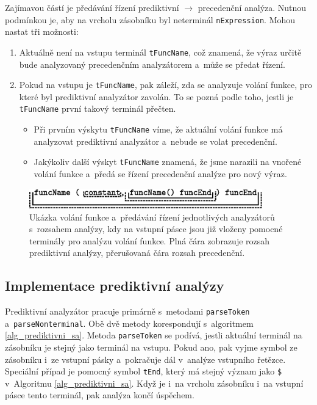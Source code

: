 Zajímavou částí je předávání řízení prediktivní $\rightarrow$ precedenční analýza.
Nutnou podmínkou je, aby na vrcholu zásobníku byl neterminál \texttt{nExpression}.
Mohou nastat tři možnosti:
\begin{enumerate}[label=\arabic*)]
    \item Aktuálně není na vstupu terminál \texttt{tFuncName}, což znamená, že výraz určitě bude analyzovaný precedenčním analyzátorem a~může se předat řízení.
    \item Pokud na vstupu je \texttt{tFuncName}, pak záleží, zda se analyzuje volání funkce, pro které byl prediktivní analyzátor zavolán.
    To se pozná podle toho, jestli je \texttt{tFuncName} první takový terminál přečten. 
    \begin{itemize}
        \item Při prvním výskytu \texttt{tFuncName} víme, že aktuální volání funkce má analyzovat prediktivní analyzátor a~nebude se volat precedenční.
        \item Jakýkoliv další výskyt \texttt{tFuncName} znamená, že jsme narazili na vnořené volání funkce a~předá se řízení precedenční analýze pro nový výraz.
    \end{itemize}  
\end{enumerate}

\begin{figure}[ht]
    \centering
    \includegraphics[width=0.9\textwidth]{obrazky-figures/volani_funkce.eps}
    \caption{Ukázka volání funkce a~předávání řízení jednotlivých analyzátorů s~rozsahem analýzy, kdy na vstupní pásce jsou již vloženy pomocné terminály pro analýzu volání funkce.
    Plná čára zobrazuje rozsah prediktivní analýzy, přerušovaná čára rozsah precedenční. }
    \label{hovno}
\end{figure}

\subsection*{Implementace prediktivní analýzy}
Prediktivní analyzátor pracuje primárně s~metodami \texttt{parseToken} a~\texttt{parseNonterminal}.
Obě dvě metody korespondují s~algoritmem \ref{alg_prediktivni_sa}.
Metoda \texttt{parseToken} se podívá, jestli aktuální terminál na zásobníku je stejný jako terminál na vstupu.
Pokud ano, pak vyjme symbol ze zásobníku i~ze vstupní pásky a~pokračuje dál v~analýze vstupního řetězce.
Speciální případ je pomocný symbol \texttt{tEnd}, který má stejný význam jako \texttt{\$} v~Algoritmu \ref{alg_prediktivni_sa}.
Když je i~na vrcholu zásobníku i~na vstupní pásce tento terminál, pak analýza končí úspěchem.

